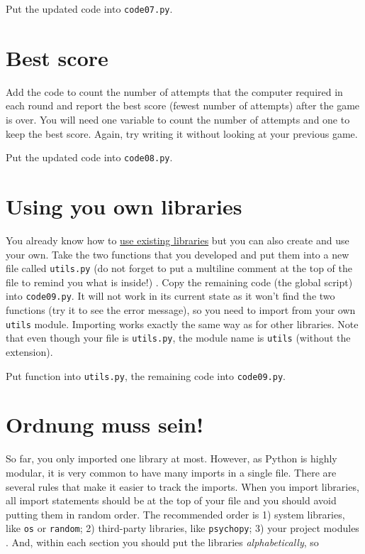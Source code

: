 \documentclass[
]{book}
\begin{document}
Put the updated code into \texttt{code07.py}.

\hypertarget{best-score-1}{%
\section{Best score}\label{best-score-1}}

Add the code to count the number of attempts that the computer required in each round and
report the best score (fewest number of attempts) after the game is over. You will need one variable to count the number of attempts and one to keep the best score. Again, try writing it without looking at your previous game.

Put the updated code into \texttt{code08.py}.

\hypertarget{using-you-own-libraries}{%
\section{Using you own libraries}\label{using-you-own-libraries}}

You already know how to \protect\hyperlink{using-libraries}{use existing libraries} but you can also create and use your own. Take the two functions that you developed and put them into a new file called \texttt{utils.py} (do not forget to put a multiline comment at the top of the file to remind you what is inside!) . Copy the remaining code (the global script) into \texttt{code09.py}. It will not work in its current state as it won't find the two functions (try it to see the error message), so you need to import from your own \texttt{utils} module. Importing works exactly the same way as for other libraries. Note that even though your file is \texttt{utils.py}, the module name is \texttt{utils} (without the extension).

Put function into \texttt{utils.py}, the remaining code into \texttt{code09.py}.

\hypertarget{keep-imports-tidy}{%
\section{Ordnung muss sein!}\label{keep-imports-tidy}}

So far, you only imported one library at most. However, as Python is highly modular, it is very common to have many imports in a single file. There are several rules that make it easier to track the imports. When you import libraries, all import statements should be at the top of your file and you should avoid putting them in random order. The recommended order is 1) system libraries, like \texttt{os} or \texttt{random}; 2) third-party libraries, like \texttt{psychopy}; 3) your project modules . And, within each section you should put the libraries \emph{alphabetically}, so
\end{document}
